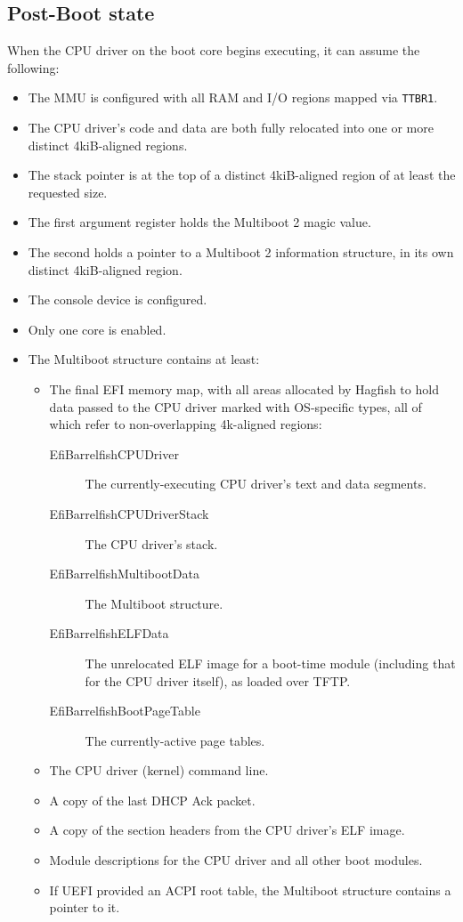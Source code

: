 \documentclass[a4paper,twoside]{report}
\begin{document}
\subsection{Post-Boot state}

When the CPU driver on the boot core begins executing, it can assume the
following:

\begin{itemize}
\item The MMU is configured with all RAM and I/O regions mapped via
\texttt{TTBR1}.
\item The CPU driver's code and data are both fully relocated into one or more
distinct 4kiB-aligned regions.
\item The stack pointer is at the top of a distinct 4kiB-aligned region of at
least the requested size.
\item The first argument register holds the Multiboot 2 magic value.
\item The second holds a pointer to a Multiboot 2 information structure, in
its own distinct 4kiB-aligned region.
\item The console device is configured.
\item Only one core is enabled.
\item The Multiboot structure contains at least:
    \begin{itemize}
    \item The final EFI memory map, with all areas allocated by Hagfish to
    hold data passed to the CPU driver marked with OS-specific types, all of
    which refer to non-overlapping 4k-aligned regions:
        \begin{description}
        \item[\ttfamily EfiBarrelfishCPUDriver]
        The currently-executing CPU driver's text and data segments.
        \item[\ttfamily EfiBarrelfishCPUDriverStack]
        The CPU driver's stack.
        \item[\ttfamily EfiBarrelfishMultibootData]
        The Multiboot structure.
        \item[\ttfamily EfiBarrelfishELFData]
        The unrelocated ELF image for a boot-time module (including that for
        the CPU driver itself), as loaded over TFTP.
        \item[\ttfamily EfiBarrelfishBootPageTable]
        The currently-active page tables.
        \end{description}
    \item The CPU driver (kernel) command line.
    \item A copy of the last DHCP Ack packet.
    \item A copy of the section headers from the CPU driver's ELF image.
    \item Module descriptions for the CPU driver and all other boot modules.
    \item If UEFI provided an ACPI root table, the Multiboot structure
    contains a pointer to it.
    \end{itemize}
\end{itemize}
\end{document}

